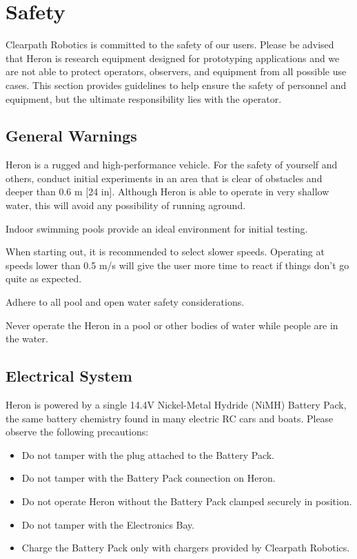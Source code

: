 \documentclass[]{clearpath-latex/clearpath-manual}
\begin{document}
\section{Safety}
Clearpath Robotics is committed to the safety of our users. Please be advised that Heron is research equipment designed for prototyping applications and we are not able to protect operators, observers, and equipment from all possible use cases. This section provides guidelines to help ensure the safety of personnel and equipment, but the ultimate responsibility lies with the operator.

\subsection{General Warnings}
Heron is a rugged and high-performance vehicle. For the safety of yourself and others, conduct initial experiments in an area that is clear of obstacles and deeper than 0.6 m [24 in]. Although Heron is able to operate in very shallow water, this will avoid any possibility of running aground.

Indoor swimming pools provide an ideal environment for initial testing.

When starting out, it is recommended to select slower speeds. Operating at speeds lower than 0.5 m/s will give the user more time to react if things don’t go quite as expected.

Adhere to all pool and open water safety considerations.

\begin{warning}
Never operate the Heron in a pool or other bodies of water while people are in the water.
\end{warning}

\subsection{Electrical System}
Heron is powered by a single 14.4V Nickel-Metal Hydride (NiMH) Battery Pack, the same battery chemistry found in many electric RC cars and boats. Please observe the following precautions:

\begin{itemize}[nolistsep]
	\item Do not tamper with the plug attached to the Battery Pack.
	\item Do not tamper with the Battery Pack connection on Heron.
	\item Do not operate Heron without the Battery Pack clamped securely in position.
	\item Do not tamper with the Electronics Bay.
	\item Charge the Battery Pack only with chargers provided by Clearpath Robotics.
\end{itemize}
\end{document}
